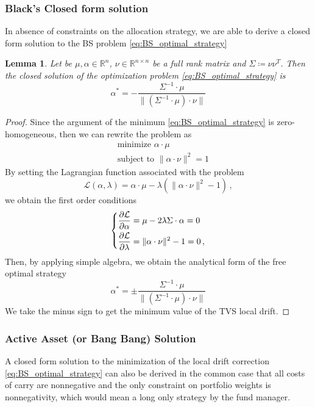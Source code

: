 \documentclass[11pt]{article}
\newtheorem{lemma}[theorem]{Lemma}
\newenvironment{eqsys}{\begin{equation}\begin{dcases}}{\end{dcases}\end{equation}}
\begin{document}
\subsubsection{Black's Closed form solution}
In absence of constraints on the allocation strategy, we are able to derive a closed form solution to the BS problem \eqref{eq:BS_optimal_strategy}
\begin{lemma}
	Let be $\mu, \alpha \in \mathbb{R}^n$, $\nu \in \mathbb{R}^{n\times n}$ be a full rank matrix and $\Sigma\coloneqq \nu \nu^T$. Then the closed solution of the optimization problem \eqref{eq:BS_optimal_strategy} is 
	\begin{equation}
			\alpha^* = - \frac{\Sigma^{-1} \cdot \mu}{\|(\Sigma^{-1} \cdot \mu)\cdot \nu\|}
	\end{equation}
\end{lemma}
\begin{proof}
Since the argument of the minimum \eqref{eq:BS_optimal_strategy} is zero-homogeneous, then we can rewrite the problem as
\begin{equation}
		\begin{aligned}
			&\text { minimize } \alpha \cdot \mu\\
			&\text { subject to } \|\alpha \cdot \nu\|^2=1
	\end{aligned}
\end{equation}
By setting the Lagrangian function associated with the problem
\begin{equation}
	\mathcal{L}\left(\alpha, \lambda\right)=\alpha \cdot \mu-\lambda\left(\|\alpha \cdot \nu\|^2-1\right) \, ,
\end{equation}
we obtain the first order conditions
\begin{eqsys}
	\frac{\partial \mathcal{L}}{\partial \alpha}=\mu -2\lambda \Sigma \cdot \alpha=0 \\
	\frac{\partial \mathcal{L}}{\partial \lambda}= \|\alpha \cdot \nu\|^2-1=0
	\, ,
\end{eqsys}
Then, by applying simple algebra, we obtain the analytical form of the free optimal strategy
\begin{equation}
	\alpha^* = \pm \frac{\Sigma^{-1} \cdot \mu}{\|(\Sigma^{-1} \cdot \mu)\cdot \nu\|}
\end{equation}
We take the minus sign to get the minimum value of the TVS local drift. 
\end{proof}
\subsubsection{Active Asset (or Bang Bang) Solution}
A closed form solution to the minimization of the local drift correction \eqref{eq:BS_optimal_strategy} can also be derived in the common case that all costs of carry are nonnegative and the only constraint on portfolio weights is nonnegativity, which would mean a long only strategy by the fund manager.
\end{document}
